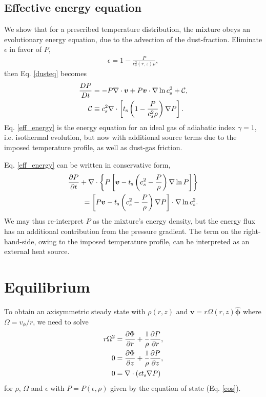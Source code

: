 \subsection{Effective energy equation}
We show that for a prescribed temperature distribution, the mixture
obeys an evolutionary energy equation, due to the advection of the
dust-fraction. Eliminate $\epsilon$ in favor of $P$, 
\begin{align*}
  \epsilon = 1 - \frac{P}{c_s^2(r,z)\rho}, 
\end{align*}
then Eq. \ref{dusteq} becomes
\begin{align}
\frac{DP}{Dt} &= - P \nabla\cdot\bm{v} + P\bm{v}\cdot\nabla\ln{c_s^2}
                + \mathcal{C},  \label{eff_energy} \\
\mathcal{C}&\equiv c_s^2 \nabla\cdot\left[t_\mathrm{s}\left(1 -
  \frac{P}{c_s^2\rho}\right)\nabla 
  P\right].
\end{align}
Eq. \ref{eff_energy} is the energy equation for an ideal gas of adiabatic index
$\gamma=1$, i.e. isothermal evolution, but now with additional source 
terms due to the imposed temperature profile, as well as dust-gas
friction.   

Eq. \ref{eff_energy} can be written in conservative form,
\begin{align*}
  \frac{\partial P}{ \partial t} + \nabla\cdot\left\{P\left[\bm{v} -
      t_\mathrm{s}\left(c_s^2 - \frac{P}{\rho}\right)\nabla\ln{P}\right]
    \right\}\\
  = \left[P\bm{v} - t_\mathrm{s}\left(c_s^2 - \frac{P}{\rho}\right)\nabla
    P\right]\cdot\nabla\ln{c_s^2}. 
\end{align*}
We may thus re-interpret $P$ as the mixture's energy density, but the
energy flux has an additional contribution from the pressure
gradient. The term on the right-hand-side, owing to the imposed
temperature profile, can be interpreted as an external heat source. 

\section{Equilibrium}\label{eqm}
To obtain an axisymmetric steady state with $\rho(r,z)$ and 
$\bm{v}=r\Omega(r,z)\hat{\bm{\phi}}$ where $\Omega = v_\phi/r$, 
we need to solve 
\begin{align}
  r\Omega^2 &= \frac{\partial \Phi}{\partial r} + \frac{1}{\rho}\frac{\partial P}{\partial
    r},\label{steady_momr}\\
  0 & = \frac{\partial\Phi}{\partial z} + \frac{1}{\rho}\frac{\partial P}{\partial z},\label{steady_momz}\\
  0 & = \nabla\cdot\left(\epsilon t_\mathrm{s}\nabla P\right) \label{steady_dust}
\end{align}
for $\rho$, $\Omega$ and $\epsilon$ with $P=P(\epsilon,\rho)$ given by
the equation of state (Eq. \ref{eos}). 

